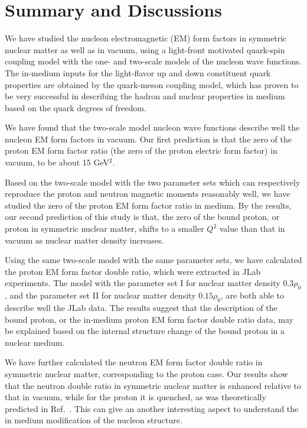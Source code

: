 \documentclass[preprint,aps,showpacs,floatfix]{revtex4}
\begin{document}
\section{Summary and Discussions}
\label{summary}


We have studied the nucleon electromagnetic (EM) form factors in symmetric nuclear matter  
as well as in vacuum, using a light-front motivated quark-spin 
coupling model with the one- and two-scale models of the nucleon wave functions.
The in-medium inputs for the light-flavor up and down constituent quark properties 
are obtained by the quark-meson coupling model, which has proven to be very successful 
in describing the hadron and nuclear properties in medium based on the quark degrees of freedom.

We have found that the two-scale model nucleon wave functions   
describe well the nucleon EM form factors in vacuum.
Our first prediction is that the zero of the proton EM 
form factor ratio (the zero of the proton electric form factor) in vacuum, 
to be about 15 GeV$^2$.

Based on the two-scale model with the two parameter sets which 
can respectively reproduce the proton and neutron magnetic moments reasonably well, 
we have studied the zero of the proton EM form factor 
ratio in medium. By the results, our second prediction of 
this study is that, the zero of the 
bound proton, or proton in symmetric nuclear matter, shifts to a smaller 
$Q^2$ value than that in vacuum as nuclear matter density increases.

Using the same two-scale model with the same parameter sets, 
we have calculated the proton EM form factor 
double ratio, which were extracted in JLab experiments.  
The model with the parameter set I for nuclear matter density $0.3 \rho_0$, 
and the parameter set II for nuclear matter density $0.15 \rho_0$, 
are both able to describe well the JLab data.
The results suggest that the description of the bound proton, 
or the in-medium proton EM form factor double ratio data,   
may be explained based on the internal structure 
change of the bound proton in a nuclear medium.

We have further calculated the neutron EM form factor double ratio  
in symmetric nuclear matter, corresponding to the proton case. 
Our results show that the neutron double ratio in symmetric nuclear matter 
is enhanced relative to that in vacuum, while for the proton it is quenched,  
as was theoretically predicted in Ref.~\cite{Cloet}. 
This can give an another interesting aspect to understand 
the in medium modification of the nucleon structure. 
\end{document}

